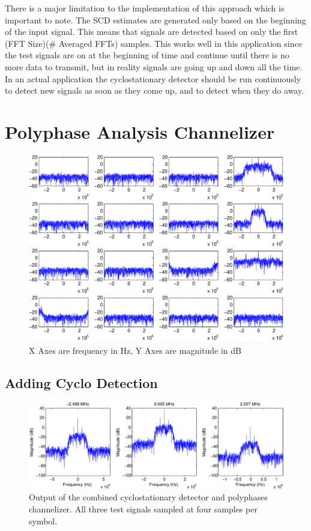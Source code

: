 \documentclass[12pt]{report}
\begin{document}
There is a major limitation to the implementation of this approach which is
important to note.  The SCD estimates are generated only based on the beginning
of the input signal. This means that signals are detected based on only the
first (FFT Size)(# Averaged FFTs) samples. This works well in this application
since the test signals are on at the beginning of time and continue until there
is no more data to transmit, but in reality signals are going up and down
all the time. In an actual application the cyclostationary detector should be
run continuously to detect new signals as soon as they come up, and to detect
when they do away.

\section{Polyphase Analysis Channelizer}
\label{sec:sim_poly}

\begin{figure}[bh!]
    \includegraphics[width=\textwidth]{polyphase_splits}%
    \caption{X Axes are frequency in Hz, Y Axes are magnitude in dB}
    \label{fig:cyclo_os_results}
\end{figure}

\subsection{Adding Cyclo Detection}
\label{sec:sim_poly_cyclo}

\begin{figure}[bh!]
    \includegraphics[width=\textwidth]{cyclo_poly_results}%
\caption{Output of the combined cyclostationary detector and polyphases channelizer. All three test signals sampled at four samples per symbol.}
\label{fig:cyclo_os_results}
\end{figure}
\end{document}
